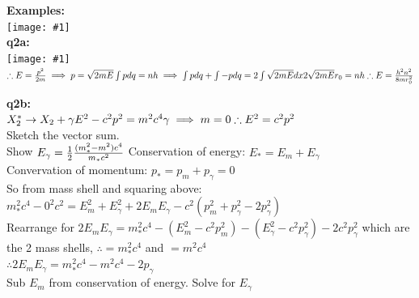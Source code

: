 \documentclass[10pt,landscape,a4paper]{article}
\newcommand{\half}{\frac{1}{2}}
\newcommand{\inlineimagesize}[2]{\texttt{[image: \#1]}\\}
\newcommand{\minititle}[1]{\textbf{#1:}\\}
\renewcommand{\^}[1]{\ensuremath{\hat{#1}}}
\begin{document}
	\begin{multicols}{2}
		\minititle{Examples}
		\inlineimagesize{q1ai.png}{0.5}
		
		\minititle{q2a}
		\inlineimagesize{q2ai.png}{0.5}
		$ \therefore E = \frac{p^2}{2m} \implies p = \sqrt{2mE}\\
		\int p dq = nh \implies \int p dq + \int -p dq = 2\int \sqrt{2mE} dx\\
		2\sqrt{2mE}r_0 = nh \therefore E = \frac{h^2n^2}{8mr_0^2} $
		
		\minititle{q2b}
		$ X^*_2 \rightarrow X_2 + \gamma \\
		E^2 - c^2p^2 = m^2c^4 \\
		\gamma \implies m=0 \therefore E^2 = c^2p^2 $\\
		Sketch the vector sum.\\
		Show $ E_\gamma = \half\frac{(m_*^2-m^2)c^4}{m_*c^2}\\ $
		Conservation of energy: $ E_* = E_m + E_\gamma $\\
		Convervation of momentum: $ p_* = p_m+p_\gamma = 0 $\\
		So from mass shell and squaring above: $ m_*^2c^4-0^2c^2 =E_m^2+E_\gamma^2+2E_mE_\gamma-c^2(p_m^2+p_\gamma^2-2p_\gamma^2) $ \\
		Rearrange for $ 2E_mE_\gamma = m_*^2c^4 - (E_m^2-c^2p_m^2) - (E_\gamma^2-c^2p_\gamma^2) -2c^2p_\gamma^2 $ which are the 2 mass shells, $ \therefore = m_*^2c^4 $ and $ = m^2c^4 $\\
		$ \therefore 2E_mE_\gamma = m_*^2c^4 - m^2c^4-2p_\gamma $\\
		Sub $ E_m $ from conservation of energy. Solve for $ E_\gamma $\\
	\end{multicols}
\end{document}
